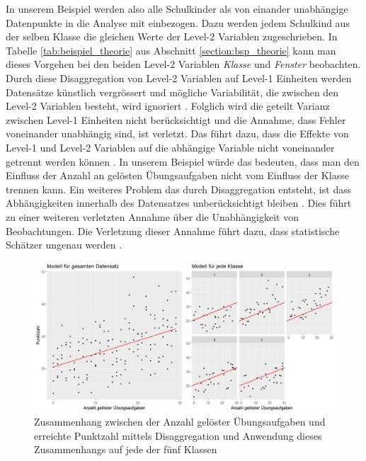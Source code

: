 \documentclass[12pt]{article}\usepackage[]{graphicx}\usepackage[]{color}
\numberwithin{equation}{section}
\begin{document}
In unserem Beispiel werden also alle Schulkinder als von einander unabhängige Datenpunkte in die Analyse mit einbezogen. Dazu werden jedem Schulkind aus der selben Klasse die gleichen Werte der Level-2 Variablen zugeschrieben. In Tabelle \ref{tab:beispiel_theorie} aus Abschnitt \ref{section:bsp_theorie} kann man dieses Vorgehen bei den beiden Level-2 Variablen \textit{Klasse} und \textit{Fenster} beobachten. Durch diese Disaggregation von Level-2 Variablen auf Level-1 Einheiten werden Datensätze künstlich vergrössert und mögliche Variabilität, die zwischen den Level-2 Variablen besteht, wird ignoriert \citep{SnijdersTomA.B2012Ma:a, woltman2012introduction}. Folglich wird die geteilt Varianz zwischen Level-1 Einheiten nicht berücksichtigt und die Annahme, dass Fehler voneinander unabhängig sind, ist verletzt. Das führt dazu, dass die Effekte von Level-1 und Level-2 Variablen auf die abhängige Variable nicht voneinander getrennt werden können \citep{woltman2012introduction}. In unserem Beispiel würde das bedeuten, dass man den Einfluss der Anzahl an gelösten Übungsaufgaben nicht vom Einfluss der Klasse trennen kann. Ein weiteres Problem das durch Disaggregation entsteht, ist dass Abhängigkeiten innerhalb des Datensatzes unberücksichtigt bleiben \citep{woltman2012introduction}. Dies führt zu einer weiteren verletzten Annahme über die Unabhängigkeit von Beobachtungen. Die Verletzung dieser Annahme führt dazu, dass statistische Schätzer ungenau werden \citep{andrew_data, SnijdersTomA.B2012Ma:a, woltman2012introduction}.

\begin{figure}[t!]
\centering
\includegraphics[width = \textwidth]{disaggregation_combined}
\caption{Zusammenhang zwischen der Anzahl gelöster Übungsaufgaben und erreichte Punktzahl mittels Disaggregation und Anwendung dieses Zusammenhangs auf jede der fünf Klassen}
\label{fig:disaggregation}
\end{figure}
\end{document}
